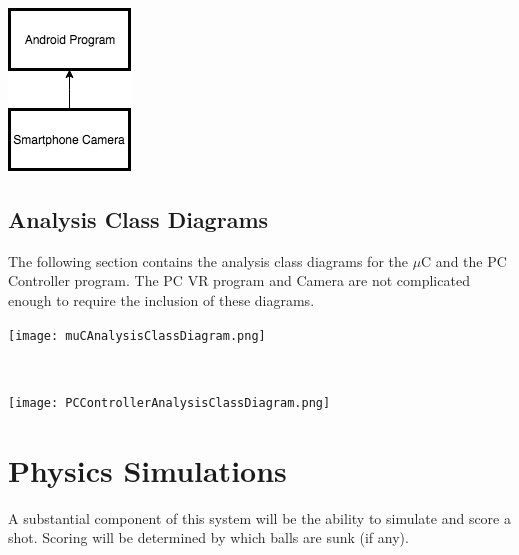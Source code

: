 \documentclass[titlepage]{article}
\begin{document}
\begin{center}
	\includegraphics[scale = 0.75]{AndroidUsesHierarchy.png}
\label{fig:android uses hierarchy diagram}
\end{center}
\newpage

\subsection{Analysis Class Diagrams}
The following section contains the analysis class diagrams for the $\mu$C and the PC Controller program. The PC VR program and Camera are not complicated enough to require the inclusion of these diagrams.\\
\begin{center}
	\texttt{[image: muCAnalysisClassDiagram.png]}
\label{fig:muC analysis class diagram}
\end{center}~\\
\begin{center}
	\texttt{[image: PCControllerAnalysisClassDiagram.png]}
\label{fig:PC controller analysis class diagram}
\end{center}
\newpage



\section{Physics Simulations}
A substantial component of this system will be the ability to simulate and score a shot. Scoring will be determined by which balls are sunk (if any).
\end{document}
